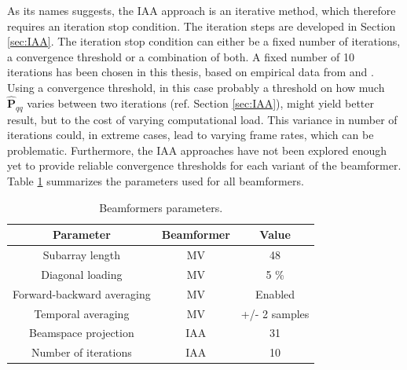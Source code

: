 As its names suggests, the IAA approach is an iterative method, which therefore requires an iteration stop condition. The iteration steps are developed in Section \ref{sec:IAA}. The iteration stop condition can either be a fixed number of iterations, a convergence threshold or a combination of both. A fixed number of 10 iterations has been chosen in this thesis, based on empirical data from \cite{Yardibi_nonparametric_IAA} and \cite{Jensen_IAA}. Using a convergence threshold, in this case probably a threshold on how much $\boldsymbol{\hat{P}}_{qq}$ varies between two iterations (ref. Section \ref{sec:IAA}), might yield better result, but to the cost of varying computational load. This variance in number of iterations could, in extreme cases, lead to varying frame rates, which can be problematic. Furthermore, the IAA approaches have not been explored enough yet to provide reliable convergence thresholds for each variant of the beamformer.
Table \ref{table:beamformers_param} summarizes the parameters used for all beamformers.

\begin{table}[!ht]
\centering
\begin{tabular}{| c | c | c |}
  \hline
  Parameter &   Beamformer   &   Value \\
  \hline
  Subarray length   &   MV &  48 \\
  Diagonal loading  &   MV &   5 \% \\
  Forward-backward averaging    &   MV  &   Enabled \\
  Temporal averaging    &   MV  &   +/- 2 samples \\
  Beamspace projection  &   IAA &   31 \\
  Number of iterations  &   IAA &   10  \\
  \hline
 \end{tabular}
\caption{Beamformers parameters.}
\label{table:beamformers_param}
\end{table}

